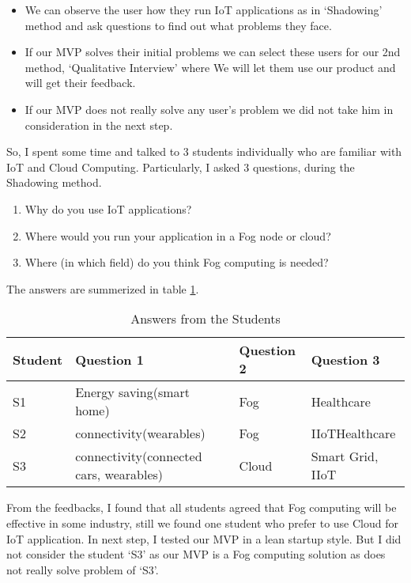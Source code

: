 \begin{itemize}
\item We can observe the user how they run \ac{IoT} applications as in `Shadowing' method and ask questions to find out what problems they face. 
\item If our \ac{MVP} solves their initial problems we can select these users for our 2nd method, `Qualitative Interview' where We will let them use our product and will get their feedback. 
\item If our \ac{MVP} does not really solve any user's problem we did not take him in consideration in the next step.
\end{itemize}

So, I spent some time and talked to 3 students individually who are familiar with \ac{IoT} and Cloud Computing. Particularly, I asked 3 questions, during the Shadowing method.

\begin{enumerate}
\item Why do you use \ac{IoT} applications? 
\item Where would you run your application in a Fog node or cloud?
\item Where (in which field) do you think Fog computing is needed?
\end{enumerate}

The answers are summerized in table \ref{table:shadowing}.


\begin{table}[H]
\centering
  \begin{tabular}{ | l | p{60mm} | l | p{60mm} |}
    \hline
    Student & Question 1 & Question 2 & Question 3 \\ \hline
    S1 & Energy saving(smart home) & Fog & Healthcare \\ \hline
    S2 & connectivity(wearables) & Fog & \ac{IIoT}\newline Healthcare \\ \hline 
    S3 & connectivity(connected cars, wearables) & Cloud & Smart Grid, \ac{IIoT}  \\
    \hline
  \end{tabular}
  \caption{Answers from the Students}
  \label{table:shadowing}
\end{table}



From the feedbacks, I found that all students agreed that Fog computing will be effective in some industry, still we found one student who prefer to use Cloud for \ac{IoT} application. In next step, I tested our \ac{MVP} in a lean startup style. But I did not consider the student `S3' as our \ac{MVP} is a Fog computing solution as does not really solve problem of `S3'. 

